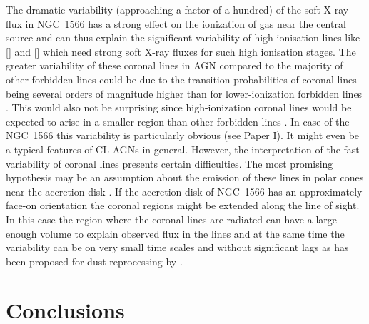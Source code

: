 \documentclass[fleqn,usenatbib]{mnras}
\begin{document}
The dramatic variability (approaching a factor of a hundred) of the soft X-ray flux in NGC~1566 has a strong effect on the ionization of gas near the central source and can thus explain the significant variability of high-ionisation lines like  [] and [] which need strong soft X-ray fluxes for such high ionisation stages. The greater variability of these coronal lines in AGN compared to the majority of other forbidden lines could be due to the transition probabilities of coronal lines being several orders of magnitude higher than for lower-ionization forbidden lines \citep{Penston1984a}. 
This would also not be surprising since high-ionization coronal lines would be expected to arise in a smaller  region than other forbidden lines \citep[see e.g., Paper I,][]{Rose2015,Netzer1974, Osterbrock1982,Oknyansky1982, Chuvaev1989, Oknyansky1991, Veilleux1988, Landt2015, Landt2015b, Parker2016}.
In case of the NGC~1566 this variability is particularly obvious (see Paper I). It might even be a typical features of CL AGNs in general. However, the interpretation of the fast variability of coronal lines presents certain difficulties. The most promising hypothesis may be an assumption about the emission of these lines in polar cones near the accretion disk \citep{Oknyansky1988, Oknyansky1989}. If the accretion disk of NGC~1566 has an approximately face-on orientation \citep{Grupe2019, Combes2019} the coronal regions might be extended along the line of sight. In this case the region where the coronal lines are radiated can have a large enough volume to explain observed flux in the lines and at the same time the variability can be on very small time scales and without significant lags as has been proposed for dust reprocessing by \citet{Oknyansky2015}.



\section{Conclusions}
\end{document}

